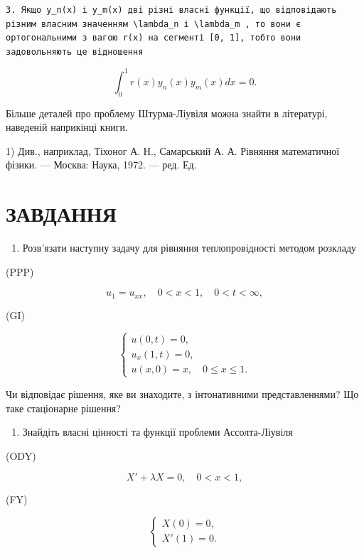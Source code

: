 \documentclass[
  ukrainian,
]{article}
\providecommand{\tightlist}{%
  \setlength{\itemsep}{0pt}\setlength{\parskip}{0pt}}
\begin{document}
\begin{verbatim}
3. Якщо y_n(x) і y_m(x) дві різні власні функції, що відповідають різним власним значенням \lambda_n і \lambda_m , то вони є ортогональними з вагою r(x) на сегменті [0, 1], тобто вони задовольняють це відношення
\end{verbatim}

\[
\int_{0}^{1} r(x) y_{n}(x) y_{m}(x) dx = 0.
\]

Більше деталей про проблему Штурма-Ліувіля можна знайти в літературі,
наведеній наприкінці книги.

1) Див., наприклад, Тіхоног А. Н., Самарський А. А. Рівняння
математичної фізики. --- Москва: Наука, 1972. --- ред. Ед.

\section{ЗАВДАННЯ}\label{ux437ux430ux432ux434ux430ux43dux43dux44f}

\begin{enumerate}
\def\labelenumi{\arabic{enumi}.}
\tightlist
\item
  Розв'язати наступну задачу для рівняння теплопровідності методом
  розкладу
\end{enumerate}

(PPP)

\[
u_1 = u_{xx}, \quad 0 < x < 1, \quad 0 < t < \infty,
\]

(GI)

\[
\begin{cases} u(0, t) = 0, \\ u_x(1, t) = 0, \\ u(x, 0) = x, \quad 0 \le x \le 1. \end{cases}
\]

Чи відповідає рішення, яке ви знаходите, з інтонативними
представленнями? Що таке стаціонарне рішення?

\begin{enumerate}
\def\labelenumi{\arabic{enumi}.}
\setcounter{enumi}{1}
\tightlist
\item
  Знайдіть власні цінності та функції проблеми Ассолта-Ліувіля
\end{enumerate}

(ODY)

\[
X' + \lambda X = 0, \quad 0 < x < 1,
\]

(FY)

\[
\begin{cases} X(0) = 0, \\ X'(1) = 0. \end{cases}
\]
\end{document}
